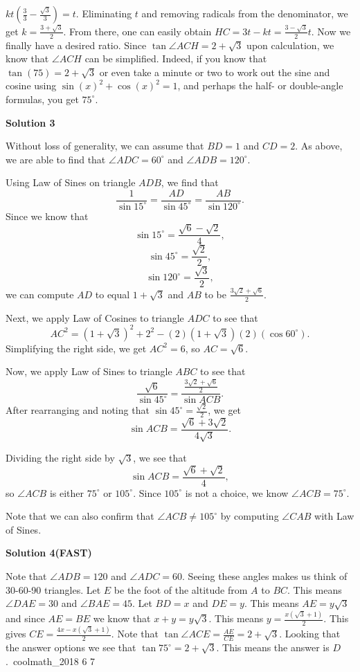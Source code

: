 \begin{enumerate}
 $kt(\frac{3}{3}-\frac{\sqrt{3}}{3})=t$. Eliminating $t$ and removing radicals from the denominator, we get $k=\frac{3+\sqrt{3}}{2}$. From there, one can easily obtain $HC=3t-kt=\frac{3-\sqrt{3}}{2}t$. Now we finally have a desired ratio. Since $\tan\angle ACH = 2+\sqrt{3}$ upon calculation, we know that $\angle ACH$ can be simplified. Indeed, if you know that $\tan(75)=2+\sqrt{3}$ or even take a minute or two to work out the sine and cosine using $\sin(x)^2+\cos(x)^2=1$, and perhaps the half- or double-angle formulas, you get $\boxed{75^\circ}$.

 



\textbf{Solution 3}

Without loss of generality, we can assume that $BD = 1$ and $CD = 2$. As above, we are able to find that $\angle ADC = 60^\circ$ and $\angle ADB = 120^\circ$.

 Using Law of Sines on triangle $ADB$, we find that 
 \[\frac{1}{\sin15^\circ} = \frac{AD}{\sin 45^\circ} = \frac{AB}{\sin 120^\circ}.\] Since we know that 
 \[\sin 15^\circ = \frac{\sqrt{6}-\sqrt{2}}{4},\] 
 \[\sin 45^\circ = \frac{\sqrt{2}}{2},\] 
 \[\sin 120^\circ = \frac{\sqrt{3}}{2},\] we can compute $AD$ to equal $1+\sqrt{3}$ and $AB$ to be $\frac{3\sqrt{2}+\sqrt{6}}{2}$.

 Next, we apply Law of Cosines to triangle $ADC$ to see that 
 \[AC^2 = (1+\sqrt{3})^2 + 2^2 - (2)(1+\sqrt{3})(2)(\cos 60^\circ).\] Simplifying the right side, we get $AC^2 = 6$, so $AC = \sqrt{6}$.

 Now, we apply Law of Sines to triangle $ABC$ to see that 
 \[\frac{\sqrt{6}}{\sin 45^\circ} = \frac{\frac{3\sqrt{2}+\sqrt{6}}{2}}{\sin ACB}.\] After rearranging and noting that $\sin 45^\circ = \frac{\sqrt{2}}{2}$, we get 
 \[\sin ACB = \frac{\sqrt{6}+3\sqrt{2}}{4\sqrt{3}}.\]

 Dividing the right side by $\sqrt{3}$, we see that 
 \[\sin ACB = \frac{\sqrt{6}+\sqrt{2}}{4},\] so $\angle ACB$ is either $75^\circ$ or $105^\circ$. Since $105^\circ$ is not a choice, we know $\angle ACB = \boxed{75^\circ}$.

 Note that we can also confirm that $\angle ACB \neq 105^\circ$ by computing $\angle CAB$ with Law of Sines.

 



\textbf{Solution 4(FAST)}

Note that $\angle{ADB} = 120$ and $\angle{ADC} = 60$. Seeing these angles makes us think of 30-60-90 triangles. Let $E$ be the foot of the altitude from $A$ to $BC$. This means $\angle{DAE} = 30$ and $\angle{BAE} = 45$. Let $BD = x$ and $DE = y$. This means $AE = y\sqrt{3}$ and since $AE = BE$ we know that $x + y = y\sqrt{3}$. This means $y = \frac{x(\sqrt{3} + 1)}{2}$. This gives $CE = \frac{4x - x(\sqrt{3} + 1)}{2}$. Note that $\tan{\angle{ACE}} = \frac{AE}{CE} = 2 + \sqrt{3}$. Looking that the answer options we see that $\tan{75^\circ} = 2 + \sqrt{3}$. This means the answer is $D$.~coolmath\_2018 6 7


\end{enumerate}
